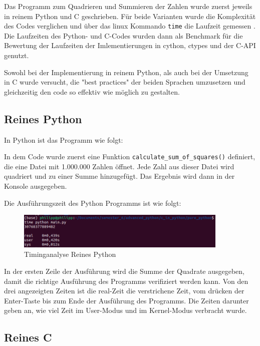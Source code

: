 \documentclass[a4paper, parskip=half]{scrartcl}
\begin{document}
Das Programm zum Quadrieren und Summieren der Zahlen wurde zuerst jeweils in reinem Python und C geschrieben. 
Für beide Varianten wurde die Komplexität des Codes verglichen und über das linux Kommando \lstinline{time} die Laufzeit gemessen \cite{time}. 
Die Laufzeiten des Python- und C-Codes wurden dann als Benchmark für die Bewertung der Laufzeiten der Imlementierungen in cython, ctypes und der C-API genutzt. 

Sowohl bei der Implementierung in reinem Python, als auch bei der Umsetzung in C wurde versucht, die "best practices" der beiden Sprachen umzusetzen und gleichzeitig den code so effektiv wie möglich zu gestalten. 


\subsection{Reines Python}

In Python ist das Programm wie folgt: 



In dem Code wurde zuerst eine Funktion \lstinline{calculate_sum_of_squares()} definiert, die eine Datei mit 1.000.000 Zahlen öffnet. Jede Zahl aus dieser Datei wird quadriert und zu einer Summe hinzugefügt. Das Ergebnis wird dann in der Konsole ausgegeben. 

Die Ausführungszeit des Python Programms ist wie folgt:

\begin{figure}[H]
    \centering
    \includegraphics[width=0.9\textwidth]{pure_python/timing_python.png}
    \caption{Timinganalyse Reines Python}
    \label{fig:timing-pure-python}
\end{figure}

In der ersten Zeile der Ausführung wird die Summe der Quadrate ausgegeben, damit die richtige Ausführung des Programms verifiziert werden kann.
Von den drei angezeigten Zeiten ist die real-Zeit die verstrichene Zeit, vom drücken der Enter-Taste bis zum Ende der Ausführung des Programms. Die Zeiten darunter geben an, wie viel Zeit im User-Modus und im Kernel-Modus verbracht wurde.

\subsection{Reines C}
\end{document}

